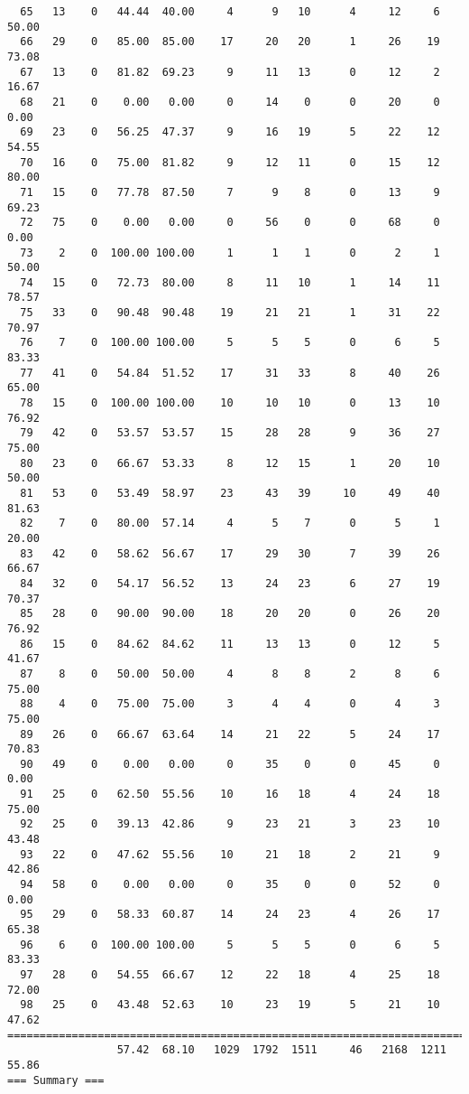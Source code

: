 \begin{verbatim}
  65   13    0   44.44  40.00     4      9   10      4     12     6    50.00
  66   29    0   85.00  85.00    17     20   20      1     26    19    73.08
  67   13    0   81.82  69.23     9     11   13      0     12     2    16.67
  68   21    0    0.00   0.00     0     14    0      0     20     0     0.00
  69   23    0   56.25  47.37     9     16   19      5     22    12    54.55
  70   16    0   75.00  81.82     9     12   11      0     15    12    80.00
  71   15    0   77.78  87.50     7      9    8      0     13     9    69.23
  72   75    0    0.00   0.00     0     56    0      0     68     0     0.00
  73    2    0  100.00 100.00     1      1    1      0      2     1    50.00
  74   15    0   72.73  80.00     8     11   10      1     14    11    78.57
  75   33    0   90.48  90.48    19     21   21      1     31    22    70.97
  76    7    0  100.00 100.00     5      5    5      0      6     5    83.33
  77   41    0   54.84  51.52    17     31   33      8     40    26    65.00
  78   15    0  100.00 100.00    10     10   10      0     13    10    76.92
  79   42    0   53.57  53.57    15     28   28      9     36    27    75.00
  80   23    0   66.67  53.33     8     12   15      1     20    10    50.00
  81   53    0   53.49  58.97    23     43   39     10     49    40    81.63
  82    7    0   80.00  57.14     4      5    7      0      5     1    20.00
  83   42    0   58.62  56.67    17     29   30      7     39    26    66.67
  84   32    0   54.17  56.52    13     24   23      6     27    19    70.37
  85   28    0   90.00  90.00    18     20   20      0     26    20    76.92
  86   15    0   84.62  84.62    11     13   13      0     12     5    41.67
  87    8    0   50.00  50.00     4      8    8      2      8     6    75.00
  88    4    0   75.00  75.00     3      4    4      0      4     3    75.00
  89   26    0   66.67  63.64    14     21   22      5     24    17    70.83
  90   49    0    0.00   0.00     0     35    0      0     45     0     0.00
  91   25    0   62.50  55.56    10     16   18      4     24    18    75.00
  92   25    0   39.13  42.86     9     23   21      3     23    10    43.48
  93   22    0   47.62  55.56    10     21   18      2     21     9    42.86
  94   58    0    0.00   0.00     0     35    0      0     52     0     0.00
  95   29    0   58.33  60.87    14     24   23      4     26    17    65.38
  96    6    0  100.00 100.00     5      5    5      0      6     5    83.33
  97   28    0   54.55  66.67    12     22   18      4     25    18    72.00
  98   25    0   43.48  52.63    10     23   19      5     21    10    47.62
============================================================================
                 57.42  68.10   1029  1792  1511     46   2168  1211    55.86
=== Summary ===


\end{verbatim}
